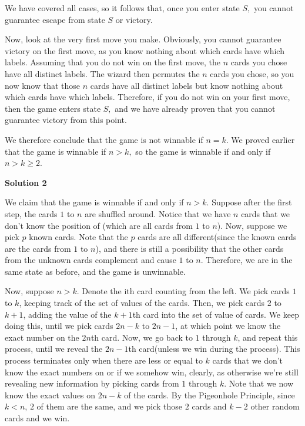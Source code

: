 \begin{enumerate}
 We have covered all cases, so it follows that, once you enter state $S,$ you cannot guarantee escape from state $S$ or victory.

 Now, look at the very first move you make. Obviously, you cannot guarantee victory on the first move, as you know nothing about which cards have which labels. Assuming that you do not win on the first move, the $n$ cards you chose have all distinct labels. The wizard then permutes the $n$ cards you chose, so you now know that those $n$ cards have all distinct labels but know nothing about which cards have which labels. Therefore, if you do not win on your first move, then the game enters state $S,$ and we have already proven that you cannot guarantee victory from this point.

 We therefore conclude that the game is not winnable if $n=k.$ We proved earlier that the game is winnable if $n>k,$ so the game is winnable if and only if $n>k\ge 2.$




\textbf{Solution 2}

We claim that the game is winnable if and only if $n>k$. Suppose after the first step, the cards $1$ to $n$ are shuffled around. Notice that we have $n$ cards that we don't know the position of (which are all cards from $1$ to $n$). Now, suppose we pick $p$ known cards. Note that the $p$ cards are all different(since the known cards are the cards from $1$ to $n$), and there is still a possibility that the other cards from the unknown cards complement and cause $1$ to $n$. Therefore, we are in the same state as before, and the game is unwinnable.

 Now, suppose $n>k$. Denote the ith card counting from the left. We pick cards $1$ to $k$, keeping track of the set of values of the cards. Then, we pick cards $2$ to $k+1$, adding the value of the $k+1$th card into the set of value of cards. We keep doing this, until we pick cards $2n-k$ to $2n-1$, at which point we know the exact number on the $2n$th card. Now, we go back to $1$ through $k$, and repeat this process, until we reveal the $2n-1$th card(unless we win during the process). This process terminates only when there are less or equal to $k$ cards that we don't know the exact numbers on or if we somehow win, clearly, as otherwise we're still revealing new information by picking cards from $1$ through $k$. Note that we now know the exact values on $2n-k$ of the cards. By the Pigeonhole Principle, since $k<n$, $2$ of them are the same, and we pick those $2$ cards and $k-2$ other random cards and we win. 

 


\end{enumerate}